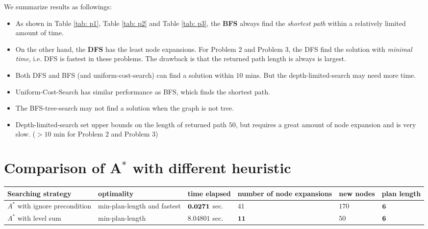 \documentclass[11pt]{article}
\begin{document}
We summarize  results as followings: 
\begin{itemize}
\item As shown in Table \ref{tab: p1}, Table \ref{tab: p2} and Table \ref{tab: p3}, the \textbf{BFS} always find the \emph{shortest path} within a relatively limited amount of time.  

\item On the other hand, the \textbf{DFS} has the least node expansions. For Problem $2$ and Problem $3$, the DFS find the solution with \emph{minimal time}, i.e. DFS is fastest in these problems.  The drawback is that the returned path length is always is largest. 

\item Both DFS and BFS (and uniform-cost-search) can find a solution within $10$ mins. But the depth-limited-search may need more time. 

\item Uniform-Cost-Search has similar performance as BFS, which finds the shortest path.

\item The BFS-tree-search may not find a solution when the graph is not tree.

\item Depth-limited-search set upper bounds on the length of returned path $50$, but requires a great amount of node expansion and is very slow. ($>10$ min for Problem $2$ and  Problem $3$)  
\end{itemize}

\section{Comparison of A$^*$ with different heuristic}
\begin{table*}[h]
 \footnotesize 
 \centering
\begin{tabular*}{0.995\textwidth}{|m{97pt}<{\centering}|m{60pt}<{\centering}|m{60pt}<{\centering}|m{60pt}<{\centering}|m{60pt}<{\centering}|m{60pt}<{\centering}|}
\hline 
Searching strategy & optimality & time elapsed  & number of node expansions &  new nodes & plan length \\ 
\hline 
\vspace{5pt} $A^*$ with ignore precondition \vspace{5pt} & min-plan-length and fastest & $\boldsymbol{0.0271}$ sec.  & $41$ & $170$  & $\boldsymbol{6}$ \\ 
\hline 
\vspace{5pt} $A^*$ with level sum \vspace{5pt} & min-plan-length  & $8.04801$ sec.  & $\textbf{11}$ & $50$  & $\boldsymbol{6}$ \\ 
\hline 
\end{tabular*} \vspace{-5pt}
\caption{\footnotesize Comparison of $A^*$ performance for problem $1$} 
\label{tab: p1}
\end{table*}
\end{document}
